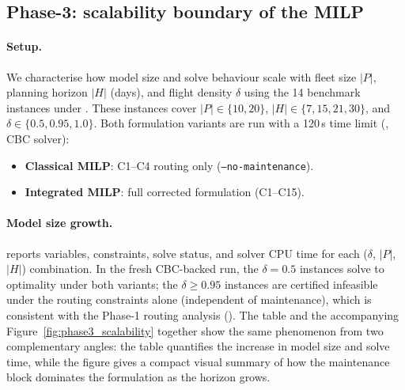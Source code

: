 \subsection{Phase-3: scalability boundary of the MILP}
\label{subsec:phase3_scalability}

\paragraph{Setup.}
We characterise how model size and solve behaviour scale with fleet size
$|P|$, planning horizon $|H|$ (days), and flight density $\delta$ using the
14 benchmark instances under .  These
instances cover $|P| \in \{10, 20\}$, $|H| \in \{7, 15, 21, 30\}$, and
$\delta \in \{0.5, 0.95, 1.0\}$.  Both formulation variants are run with a
120\,s time limit (, CBC solver):
\begin{itemize}
  \item \textbf{Classical MILP}: C1--C4 routing only (\texttt{--no-maintenance}).
  \item \textbf{Integrated MILP}: full corrected formulation (C1--C15).
\end{itemize}

\paragraph{Model size growth.}
 reports variables, constraints, solve status, and
solver CPU time for each ($\delta$, $|P|$, $|H|$) combination.  In the fresh
CBC-backed run, the $\delta=0.5$ instances solve to optimality under both
variants; the $\delta \geq 0.95$ instances are certified infeasible under the
routing constraints alone (independent of maintenance), which is consistent
with the Phase-1 routing analysis ().
The table and the accompanying Figure~\ref{fig:phase3_scalability} together
show the same phenomenon from two complementary angles: the table quantifies
the increase in model size and solve time, while the figure gives a compact
visual summary of how the maintenance block dominates the formulation as the
horizon grows.

